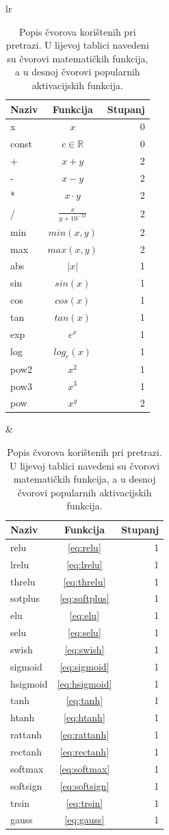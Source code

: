 \documentclass[times, utf8, numeric, diplomski]{fer}
\def\realnum{\mathbb{R}}
\begin{document}
\begin{table}[H]
\centering
\begin{tabular}[t]{lr}
\begin{tabular}[t]{l|c|r}
\textbf{Naziv} & \textbf{Funkcija} & \textbf{Stupanj} \\
\hline
x		& $x$					& 0 \\
const	& $c \in \realnum$		& 0 \\
\hline
+		& $x + y$				& 2 \\
-		& $x - y$				& 2 \\
*		& $x \cdot y$			& 2 \\
/		& $\frac{x}{y + 10^{-12}}$	& 2 \\
\hline
min		& $min(x, y)$			& 2 \\
max		& $max(x, y)$			& 2 \\
abs		& $|x|$					& 1 \\
\hline
sin		& $sin(x)$				& 1 \\
cos		& $cos(x)$				& 1 \\
tan		& $tan(x)$				& 1 \\
\hline
exp		& $e^x$					& 1 \\
log		& $log_e(x)$				& 1 \\
pow2		& $x^2$					& 1 \\
pow3		& $x^3$					& 1 \\
pow		& $x^y$					& 2 \\
\end{tabular}
& \quad
\begin{tabular}[t]{l|c|r}
\textbf{Naziv} & \textbf{Funkcija} & \textbf{Stupanj} \\
\hline
relu		& \eqref{eq:relu}		& 1 \\
lrelu	& \eqref{eq:lrelu}		& 1 \\
threlu 	& \eqref{eq:threlu}		& 1 \\
sotplus	& \eqref{eq:softplus}	& 1 \\
elu		& \eqref{eq:elu}			& 1 \\
selu		& \eqref{eq:selu}		& 1 \\
swish	& \eqref{eq:swish}		& 1 \\
sigmoid	& \eqref{eq:sigmoid}		& 1 \\
hsigmoid & \eqref{eq:hsigmoid}	& 1 \\
tanh		& \eqref{eq:tanh}		& 1 \\
htanh 	& \eqref{eq:htanh}		& 1 \\
rattanh & \eqref{eq:rattanh}		& 1 \\
rectanh & \eqref{eq:rectanh}		& 1 \\
softmax	& \eqref{eq:softmax}		& 1 \\
softsign	& \eqref{eq:softsign}	& 1 \\
trsin 	& \eqref{eq:trsin}		& 1 \\
gauss	& \eqref{eq:gauss}		& 1 \\
\end{tabular}
\end{tabular}
\caption{Popis čvorova korištenih pri pretrazi. U lijevoj tablici navedeni su čvorovi matematičkih funkcija, a u desnoj čvorovi popularnih aktivacijskih funkcija.}
\end{table}
\end{document}

